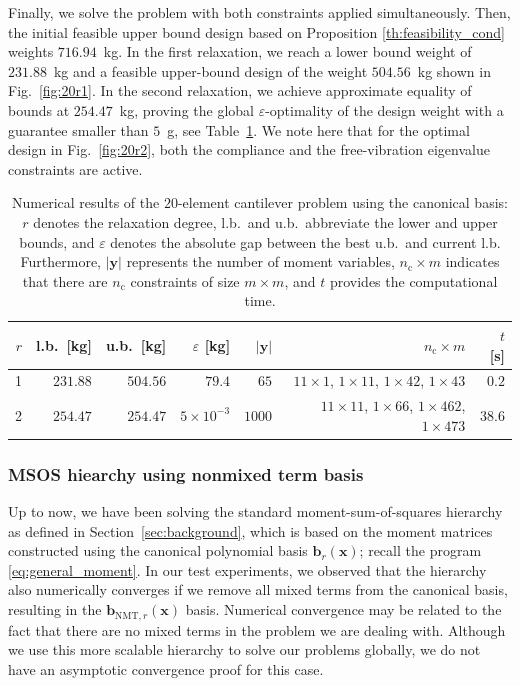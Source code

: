 \documentclass[final,onefignum,onetabnum]{siamart220329}
\begin{document}
Finally, we solve the problem with both constraints applied simultaneously. Then, the initial feasible upper bound design based on Proposition \ref{th:feasibility_cond} weights $716.94$~kg. In the first relaxation, we reach a lower bound weight of $231.88$~kg and a feasible upper-bound design of the weight $504.56$~kg shown in Fig.~\ref{fig:20r1}. In the second relaxation, we achieve approximate equality of bounds at $254.47$~kg, proving the global $\varepsilon$-optimality of the design {weight} with a guarantee smaller than $5$~g, see Table~\ref{tab:20}. We note here that for the optimal design in Fig.~\ref{fig:20r2}, both the compliance and the free-vibration eigenvalue constraints are active.

\begin{table}[!htbp]
    \centering
    \begin{tabular}{rrrrrrr}
         $r$ & l.b.\ [kg] & u.b.\ [kg] & $\varepsilon$ [kg] & $\lvert \mathbf{y}\rvert$ & $n_\mathrm{c} \times m$  & $t$ [s]\\ \hline
         1 & $231.88$ & $504.56$ & $79.4$ & $65$ & $11\times1$, $1\times11$, $1\times42$, $1 \times 43$ & $0.2$\\
         2 & $254.47$ & $254.47$ & $5 \times 10^{-3}$ & $1000$ & $11\times11$, $1\times66$, $1\times462$, $1\times473$ & $38.6$
    \end{tabular}
    \caption{Numerical results of the $20$-element cantilever problem using the canonical basis: $r$ denotes the relaxation degree, l.b.\ and u.b.\ abbreviate the lower and upper bounds, and $\varepsilon$ denotes the absolute gap between the best u.b.\ and current l.b. Furthermore, $\lvert\mathbf{y}\rvert$ represents the number of moment variables, $n_\mathrm{c}\times m$ indicates that there are $n_\mathrm{c}$ constraints of size $m\times m$, and $t$ provides the computational time.}
    \label{tab:20}
\end{table}

\subsubsection{MSOS hiearchy using nonmixed term basis} Up to now, we have been solving the standard moment-sum-of-squares hierarchy as defined in Section~\ref{sec:background}, which is based on the moment matrices constructed using the canonical polynomial basis $\mathbf{b}_r(\mathbf{x})$; recall the program \eqref{eq:general_moment}. In our test experiments, we observed that the hierarchy also numerically converges if we remove all mixed terms from the canonical basis, resulting in the $\mathbf{b}_{\mathrm{NMT},r}(\mathbf{x})$ basis. Numerical convergence may be related to the fact that there are no mixed terms in the problem we are dealing with. Although we use this more scalable hierarchy to solve our problems globally, we do not have an asymptotic convergence proof for this case. 
\end{document}
